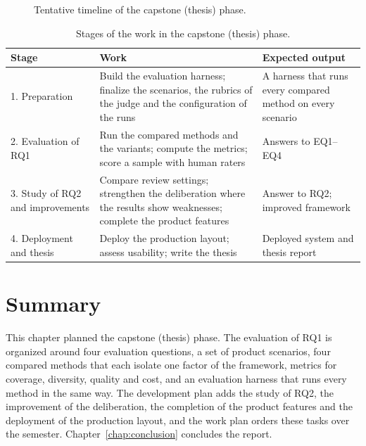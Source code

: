 \begin{figure}[H]
    \centering
    \resizebox{\linewidth}{!}{}
    \caption{Tentative timeline of the capstone (thesis) phase.}
    \label{fig:np-gantt}
\end{figure}

\begin{table}[H]
    \centering
    \caption{Stages of the work in the capstone (thesis) phase.}
    \label{tab:work-plan}
    \begin{tabularx}{\linewidth}{|p{3.3cm}|X|X|}
        \hline
        \textbf{Stage} & \textbf{Work} & \textbf{Expected output} \\
        \hline
        1. Preparation & Build the evaluation harness; finalize the scenarios, the rubrics of the judge and the configuration of the runs & A harness that runs every compared method on every scenario \\
        \hline
        2. Evaluation of RQ1 & Run the compared methods and the variants; compute the metrics; score a sample with human raters & Answers to EQ1--EQ4 \\
        \hline
        3. Study of RQ2 and improvements & Compare review settings; strengthen the deliberation where the results show weaknesses; complete the product features & Answer to RQ2; improved framework \\
        \hline
        4. Deployment and thesis & Deploy the production layout; assess usability; write the thesis & Deployed system and thesis report \\
        \hline
    \end{tabularx}
\end{table}

\section{Summary}
\label{sec:np-summary}
This chapter planned the capstone (thesis) phase. The evaluation of RQ1 is organized around four evaluation questions, a set of product scenarios, four compared methods that each isolate one factor of the framework, metrics for coverage, diversity, quality and cost, and an evaluation harness that runs every method in the same way. The development plan adds the study of RQ2, the improvement of the deliberation, the completion of the product features and the deployment of the production layout, and the work plan orders these tasks over the semester. Chapter~\ref{chap:conclusion} concludes the report.
